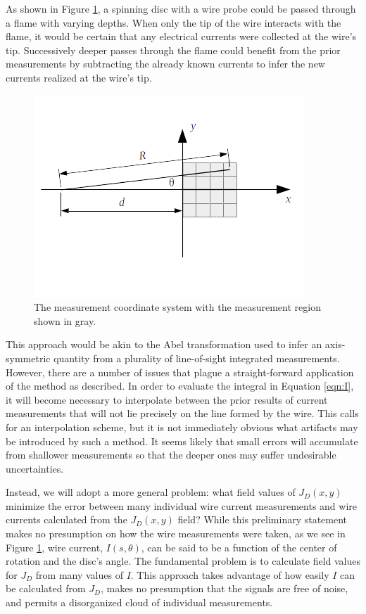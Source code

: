 As shown in Figure \ref{fig:coordinate}, a spinning disc with a wire probe could be passed through a flame with varying depths.  When only the tip of the wire interacts with the flame, it would be certain that any electrical currents were collected at the wire's tip.  Successively deeper passes through the flame could benefit from the prior measurements by subtracting the already known currents to infer the new currents realized at the wire's tip. 

\begin{figure}
\begin{center}
\includegraphics{coordinates}
\caption{The measurement coordinate system with the measurement region shown in gray.}\label{fig:coordinate}
\end{center}
\end{figure}

This approach would be akin to the Abel transformation used to infer an axis-symmetric quantity from a plurality of line-of-sight integrated measurements.  However, there are a number of issues that plague a straight-forward application of the method as described.  In order to evaluate the integral in Equation \ref{eqn:I}, it will become necessary to interpolate between the prior results of current measurements that will not lie precisely on the line formed by the wire.  This calls for an interpolation scheme, but it is not immediately obvious what artifacts may be introduced by such a method.  It seems likely that small errors will accumulate from shallower measurements so that the deeper ones may suffer undesirable uncertainties.

Instead, we will adopt a more general problem: what field values of $J_D(x,y)$ minimize the error between many individual wire current measurements and wire currents calculated from the $J_D(x,y)$ field?  While this preliminary statement makes no presumption on how the wire measurements were taken, as we see in Figure \ref{fig:coordinate}, wire current, $I(s,\theta)$, can be said to be a function of the center of rotation and the disc's angle.  The fundamental problem is to calculate field values for $J_D$ from many values of $I$.  This approach takes advantage of how easily $I$ can be calculated from $J_D$, makes no presumption that the signals are free of noise, and permits a disorganized cloud of individual measurements.

